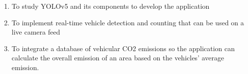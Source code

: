 \begin{comment}
How to formulate your research objectives:
1. Identify what research steps do you need to perform to achieve your general objective.
2. Identify the questions that must be answered for you to achieve your general objective.
    Thereafter, convert these questions into action statements

Example #1:

Research Question:
  What are the general features of a web-based learning environment?

Specific Objective:
   To review existing web-based learning environment that teaches language learning for children


Example #2:

Research Question:
   How will you represent commonsense knowledge for use by computer systems?

Specific Objective:
   To identify knowledge representation approaches used by existing story generation systems

Example #3:
Research Question:
   What types of storytelling knowledge are needed to generate stories?

Specific Objective:
    To identify the different types of storytelling knowledge used in generating stories

Example #4:
Research Question:
    What machine learning approaches will you utilize?

Specific Objective:
    To determine existing machine learning algorithms [that can be used in training the computer system to detect cyberbullying cases] 

Example #5: Research Question:
    How will your research output be evaluated?

Specific Objective:
    To define evaluation metrics for validating the accuracy of the translation

\end{comment}

%
%

\begin{enumerate}
   
   \item To study YOLOv5 and its components to develop the application
   \item To implement real-time vehicle detection and counting that can be used on a live camera feed
   \item To integrate a database of vehicular CO2 emissions so the application can calculate the overall emission of an area based on the vehicles' average emission.

\end{enumerate}


